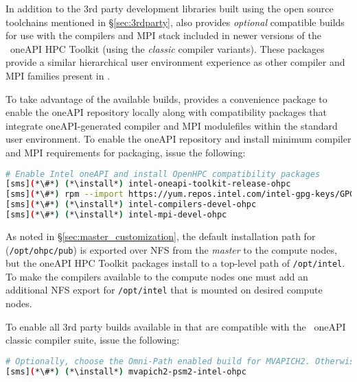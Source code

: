 In addition to the 3rd party development libraries built using the open source
toolchains mentioned in \S\ref{sec:3rdparty}, \OHPC{} also provides {\em
  optional} compatible builds for use with the compilers and MPI stack included
in newer versions of the \IntelR{}~oneAPI HPC Toolkit (using the {\em classic}
compiler variants).  These
packages provide a similar hierarchical user
environment experience as other compiler and MPI families present in \OHPC{}.

To take advantage of the available builds, \OHPC{} provides a convenience
package to enable the oneAPI repository locally along with compatibility
packages that integrate oneAPI-generated compiler and MPI modulefiles within
the standard \OHPC{} user environment. To enable the \IntelR{} oneAPI
repository and install minimum compiler and MPI requirements for \OHPC{}
packaging, issue the following:

\begin{lstlisting}[language=bash,keywords={},upquote=true,keepspaces]
# Enable Intel oneAPI and install OpenHPC compatibility packages
[sms](*\#*) (*\install*) intel-oneapi-toolkit-release-ohpc
[sms](*\#*) rpm --import https://yum.repos.intel.com/intel-gpg-keys/GPG-PUB-KEY-INTEL-SW-PRODUCTS.PUB
[sms](*\#*) (*\install*) intel-compilers-devel-ohpc
[sms](*\#*) (*\install*) intel-mpi-devel-ohpc
\end{lstlisting}


\begin{center}
\begin{tcolorbox}[]
As noted in \S\ref{sec:master_customization}, the default installation path for
\OHPC{} (\texttt{/opt/ohpc/pub}) is exported over NFS from the {\em master} to the
compute nodes, but the \IntelR{} oneAPI HPC Toolkit packages install to a top-level path of
\texttt{/opt/intel}. To make the \IntelR{} compilers available to the compute
nodes one must add an additional NFS export
for \texttt{/opt/intel} that is mounted on desired compute nodes.
\end{tcolorbox}
\end{center}

\noindent To enable all 3rd party builds available in \OHPC{} that are compatible with
the \IntelR{}~oneAPI classic compiler suite, issue the following:


\begin{lstlisting}[language=bash,keywords={},upquote=true,keepspaces]
# Optionally, choose the Omni-Path enabled build for MVAPICH2. Otherwise, skip to retain IB variant
[sms](*\#*) (*\install*) mvapich2-psm2-intel-ohpc
\end{lstlisting}


